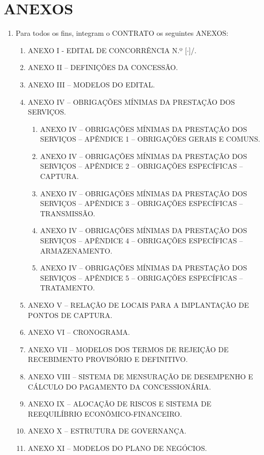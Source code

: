 \documentclass[a4paper,11pt]{report} %
\newcommand{\NumeroLicitacao}{[$\cdot$]}
\newcommand{\AnoLicitacao}{\the\year}
\begin{document}
\section{ANEXOS}
\label{sec:RML7}
\begin{enumerate}

\item \label{itm:FAGK} Para todos os fins, integram o CONTRATO os seguintes ANEXOS:

\begin{enumerate}[label*=\arabic*.]
\item \label{itm:YJ3Y} ANEXO I - EDITAL DE CONCORRÊNCIA N.º \NumeroLicitacao/\AnoLicitacao. 
\item \label{itm:DMBQ} ANEXO II – DEFINIÇÕES DA CONCESSÃO.
\item \label{itm:3NLU} ANEXO III – MODELOS DO EDITAL.
\item \label{itm:4K53} ANEXO IV – OBRIGAÇÕES MÍNIMAS DA PRESTAÇÃO DOS SERVIÇOS.

\begin{enumerate}[label*=\arabic*.]
\item \label{itm:AQMQ} ANEXO IV – OBRIGAÇÕES MÍNIMAS DA PRESTAÇÃO DOS SERVIÇOS – APÊNDICE 1 – OBRIGAÇÕES GERAIS E COMUNS.
\item \label{itm:LSCC} ANEXO IV – OBRIGAÇÕES MÍNIMAS DA PRESTAÇÃO DOS SERVIÇOS – APÊNDICE 2 – OBRIGAÇÕES ESPECÍFICAS – CAPTURA.
\item \label{itm:ELKY} ANEXO IV – OBRIGAÇÕES MÍNIMAS DA PRESTAÇÃO DOS SERVIÇOS – APÊNDICE 3 – OBRIGAÇÕES ESPECÍFICAS – TRANSMISSÃO.
\item \label{itm:CKKV} ANEXO IV – OBRIGAÇÕES MÍNIMAS DA PRESTAÇÃO DOS SERVIÇOS – APÊNDICE 4 – OBRIGAÇÕES ESPECÍFICAS – ARMAZENAMENTO.
\item \label{itm:3KD3} ANEXO IV – OBRIGAÇÕES MÍNIMAS DA PRESTAÇÃO DOS SERVIÇOS – APÊNDICE 5 – OBRIGAÇÕES ESPECÍFICAS – TRATAMENTO.
\end{enumerate}

\item \label{itm:57Z2} ANEXO V – RELAÇÃO DE LOCAIS PARA A IMPLANTAÇÃO DE PONTOS DE CAPTURA.
\item \label{itm:BT27} ANEXO VI – CRONOGRAMA.
\item \label{itm:2P3J} ANEXO VII – MODELOS DOS TERMOS DE REJEIÇÃO DE RECEBIMENTO PROVISÓRIO E DEFINITIVO.
\item \label{itm:SXAQ} ANEXO VIII – SISTEMA DE MENSURAÇÃO DE DESEMPENHO E CÁLCULO DO PAGAMENTO DA CONCESSIONÁRIA.
\item \label{itm:YTEB} ANEXO IX – ALOCAÇÃO DE RISCOS E SISTEMA DE REEQUILÍBRIO ECONÔMICO-FINANCEIRO.
\item \label{itm:KGA3} ANEXO X – ESTRUTURA DE GOVERNANÇA.
\item \label{itm:C8YR} ANEXO XI – MODELOS DO PLANO DE NEGÓCIOS.


\end{enumerate}
\end{enumerate}
\end{document}
